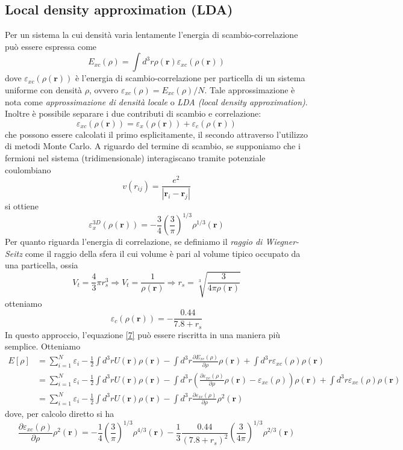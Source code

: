 \documentclass[11pt,a4paper]{article}
\begin{document}
\subsection{Local density approximation (LDA)}
Per un sistema la cui densità varia lentamente l'energia di scambio-correlazione può essere espressa come
\begin{equation}
E_{xc}(\rho) = \int d^3r \rho(\textbf{r}) \varepsilon_{xc}(\rho(\textbf{r}))
\end{equation}
dove $\varepsilon_{xc}(\rho(\textbf{r}))$ è l'energia di scambio-correlazione per particella di un sistema uniforme con densità $\rho$, ovvero $\varepsilon_{xc}(\rho) = E_{xc}(\rho)/N$. Tale approssimazione è nota come \emph{approssimazione di densità locale} o \emph{LDA (local density approximation)}. Inoltre è possibile separare i due contributi di scambio e correlazione:
\begin{equation}
\varepsilon_{xc}(\rho(\textbf{r})) = \varepsilon_{x}(\rho(\textbf{r})) + \varepsilon_c(\rho(\textbf{r})) 
\end{equation}
che possono essere calcolati il primo esplicitamente, il secondo attraverso l'utilizzo di metodi Monte Carlo. A riguardo del termine di scambio, se supponiamo che i fermioni nel sistema (tridimensionale) interagiscano tramite potenziale coulombiano
\[
v(r_{ij}) = \frac{e^2}{|\textbf{r}_i-\textbf{r}_j|}
\]
si ottiene
\begin{equation}
\varepsilon_{x}^{3D}(\rho(\textbf{r})) = -\frac{3}{4}\left( \frac{3}{\pi} \right)^{1/3}\rho^{1/3}(\textbf{r})
\end{equation}
Per quanto riguarda l'energia di correlazione, se definiamo il \emph{raggio di Wiegner-Seitz} come il raggio della sfera il cui volume è pari al volume tipico occupato da una particella, ossia 
\[
V_t = \frac{4}{3}\pi r_s^3 \Longrightarrow V_t = \frac{1}{\rho(\textbf{r})} \Longrightarrow r_s = \sqrt[3]{\frac{3}{4\pi \rho(\textbf{r})}}
\]
otteniamo
\begin{equation}
\varepsilon_c(\rho(\textbf{r})) = -\frac{0.44}{7.8 +r_s}
\end{equation}
In questo approccio, l'equazione \eqref{7} può essere riscritta in una maniera più semplice. Otteniamo
\[
\begin{split}
E[\rho] &= \sum_{i=1}^N \varepsilon_i - \frac{1}{2}\int d^3r U(\textbf{r}) \rho(\textbf{r}) - \int d^3r \frac{\partial E_{xc}(\rho)}{\partial \rho}\rho(\textbf{r}) + \int d^3r \varepsilon_{xc}(\rho)\rho(\textbf{r}) \\
&= \sum_{i=1}^N \varepsilon_i - \frac{1}{2}\int d^3r U(\textbf{r}) \rho(\textbf{r}) - \int d^3r \left( \frac{\partial \varepsilon_{xc}(\rho)}{\partial\rho}\rho(\textbf{r}) - \varepsilon_{xc}(\rho) \right)\rho(\textbf{r}) + \int d^3r \varepsilon_{xc}(\rho)\rho(\textbf{r}) \\
&= \sum_{i=1}^N \varepsilon_i - \frac{1}{2}\int d^3r U(\textbf{r}) \rho(\textbf{r}) - \int d^3r \frac{\partial \varepsilon_{xc}(\rho)}{\partial\rho}\rho^2(\textbf{r})
\end{split}
\]
dove, per calcolo diretto si ha
\[
\frac{\partial \varepsilon_{xc}(\rho)}{\partial\rho}\rho^2(\textbf{r}) = -\frac{1}{4}\left( \frac{3}{\pi}\right)^{1/3}\rho^{4/3}(\textbf{r}) - \frac{1}{3}\frac{0.44}{(7.8+r_s)^2}\left( \frac{3}{4\pi} \right)^{1/3}\rho^{2/3}(\textbf{r})
\]
\end{document}
